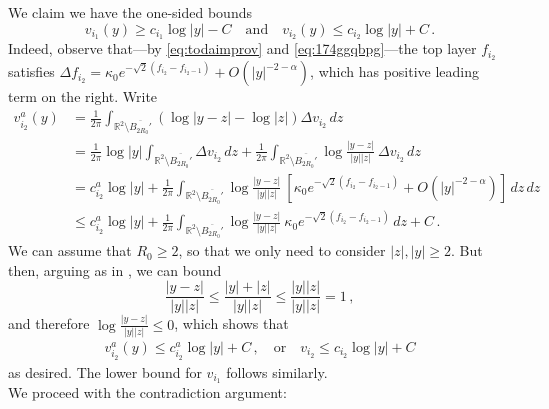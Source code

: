 \documentclass{article}
\newcommand{\R}{\mathbb{R}}
\theoremstyle{definition}
\begin{document}
We claim we have the one-sided bounds
$$v_{i_1}(y)\geq c_{i_1}\log|y|-C \quad\mbox{and}\quad v_{i_2}(y)\leq c_{i_2}\log|y|+C\,.$$
Indeed, observe that---by \eqref{eq:todaimprov} and \eqref{eq:174ggqbpg}---the top layer $f_{i_2}$ satisfies $\Delta f_{i_2}=\kappa_0e^{-\sqrt{2}(f_{i_2}-f_{i_2-1})}+O(|y|^{-2-\alpha})$, which has positive leading term on the right. Write
\begin{align*}
    v_{i_2}^a(y)&=\frac{1}{2\pi}\int_{\R^2\setminus \overline{B_{2R_0}'}} (\log|y-z|-\log |z|) \Delta v_{i_2}\,dz\\
    &= \frac{1}{2\pi}\log|y|\int_{\R^2\setminus \overline{B_{2R_0}'}} \Delta v_{i_2}\,dz+ \frac{1}{2\pi}\int_{\R^2\setminus \overline{B_{2R_0}'}} \log\frac{|y-z|}{|y||z|}\ \Delta v_{i_2}\,dz\\
    &= c_{i_2}^a\log|y|+ \frac{1}{2\pi}\int_{\R^2\setminus \overline{B_{2R_0}'}} \log\frac{|y-z|}{|y||z|}\ \left[\kappa_0 e^{-\sqrt{2}(f_{i_2}-f_{i_2-1})}+O(|y|^{-2-\alpha})\right]\,dz\,dz\\
    &\leq c_{i_2}^a\log|y|+ \frac{1}{2\pi}\int_{\R^2\setminus \overline{B_{2R_0}'}} \log\frac{|y-z|}{|y||z|}\ \kappa_0e^{-\sqrt{2}(f_{i_2}-f_{i_2-1})}\,dz+C\,.
\end{align*}
We can assume that $R_0\geq 2$, so that we only need to consider $|z|,|y|\geq 2$. But then, arguing as in \cite[Lemma 2.1]{Lin98}, we can bound
$$\frac{|y-z|}{|y||z|}\leq \frac{|y|+|z|}{|y||z|}\leq \frac{|y||z|}{|y||z|}=1\,,$$
and therefore $\log \frac{|y-z|}{|y||z|}\leq 0$, which shows that
\begin{align*}
    v_{i_2}^a(y)\leq c_{i_2}^a\log|y|+ C\,,\quad\mbox{or}\quad v_{i_2}\leq c_{i_2}\log|y|+C
\end{align*}
as desired. The lower bound for $v_{i_1}$ follows similarly.\\

We proceed with the contradiction argument:
\end{document}
